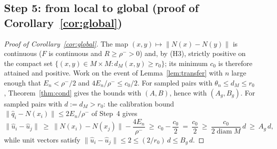 \documentclass[review,supplement]{siamart220329}
\begin{document}
\subsection*{Step 5: from local to global (proof of Corollary~\ref{cor:global})}
\begin{proof}[Proof of Corollary~\ref{cor:global}]
The map $(x,y)\mapsto\lVert N(x)-N(y)\rVert$ is continuous ($F$ is continuous
and $R\ge\rho^->0$) and, by (H3), strictly positive on the compact set
$\{(x,y)\in M\times M: d_M(x,y)\ge r_0\}$; its minimum $c_0$ is therefore
attained and positive. Work on the event of Lemma~\ref{lem:transfer} with $n$
large enough that $E_n<\rho^-/2$ and $4E_n/\rho^-\le c_0/2$. For sampled pairs
with $\theta_n\le d_M\le r_0$, Theorem~\ref{thm:cond} gives the bounds with
$(A,B)$, hence with $(A_g,B_g)$. For sampled pairs with $d:=d_M>r_0$: the
calibration bound $\lVert\hat q_i-N(x_i)\rVert\le2E_n/\rho^-$ of Step~4 gives
\[
\lVert\hat u_i-\hat u_j\rVert
\ \ge\ \lVert N(x_i)-N(x_j)\rVert-\frac{4E_n}{\rho^-}
\ \ge\ c_0-\frac{c_0}{2}\ =\ \frac{c_0}{2}
\ \ge\ \frac{c_0}{2\operatorname{diam}M}\,d\ \ge\ A_g\,d,
\]
while unit vectors satisfy
$\lVert\hat u_i-\hat u_j\rVert\le2\le(2/r_0)\,d\le B_g\,d$.
\end{proof}
\end{document}
